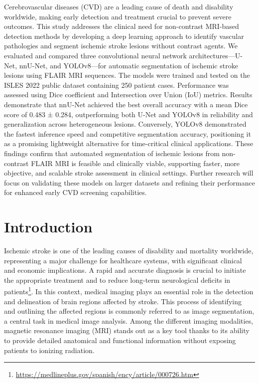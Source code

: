 \documentclass[12pt]{article}
\begin{document}
{%

Cerebrovascular diseases (CVD) are a leading cause of death and disability worldwide, making early detection and treatment crucial to prevent severe outcomes. This study addresses the clinical need for non-contrast MRI-based detection methods by developing a deep learning approach to identify vascular pathologies and segment ischemic stroke lesions without contrast agents. We evaluated and compared three convolutional neural network architectures—U-Net, nnU-Net, and YOLOv8—for automatic segmentation of ischemic stroke lesions using FLAIR MRI sequences. The models were trained and tested on the ISLES 2022 public dataset containing 250 patient cases. Performance was assessed using Dice coefficient and Intersection over Union (IoU) metrics. Results demonstrate that nnU-Net achieved the best overall accuracy with a mean Dice score of 0.483 ± 0.284, outperforming both U-Net and YOLOv8 in reliability and generalization across heterogeneous lesions. Conversely, YOLOv8 demonstrated the fastest inference speed and competitive segmentation accuracy, positioning it as a promising lightweight alternative for time-critical clinical applications. These findings confirm that automated segmentation of ischemic lesions from non-contrast FLAIR MRI is feasible and clinically viable, supporting faster, more objective, and scalable stroke assessment in clinical settings. Further research will focus on validating these models on larger datasets and refining their performance for enhanced early CVD screening capabilities.

}



\section{Introduction} \label{sec:introduction}

Ischemic stroke is one of the leading causes of disability and mortality worldwide, representing a major challenge for healthcare systems, with significant clinical and economic implications. A rapid and accurate diagnosis is crucial to initiate the appropriate treatment and to reduce long-term neurological deficits in patients\footnote {\url{https://medlineplus.gov/spanish/ency/article/000726.htm}}. In this context, medical imaging plays an essential role in the detection and delineation of brain regions affected by stroke. This process of identifying and outlining the affected regions is commonly referred to as image segmentation, a central task in medical image analysis.  Among the different imaging modalities, magnetic resonance imaging (MRI) stands out as a key tool thanks to its ability to provide detailed anatomical and functional information without exposing patients to ionizing radiation.
\end{document}

